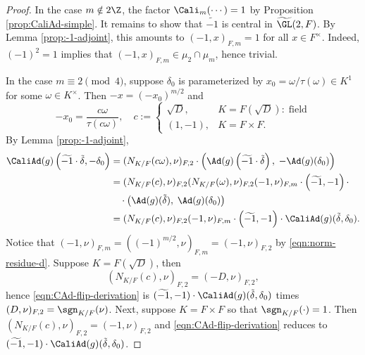 \documentclass[a4paper,10pt]{article}
\begin{document}
\begin{proof}	
	In the case $m \notin 2\Z$, the factor $\Cali_m(\cdots) = 1$ by Proposition \ref{prop:CaliAd-simple}. It remains to show that $\widetilde{-1}$ is central in $\widetilde{\GL}(2,F)$. By Lemma \ref{prop:-1-adjoint}, this amounts to $(-1, x)_{F,m} = 1$ for all $x \in F^\times$. Indeed, $(-1)^2 = 1$ implies that $(-1, x)_{F,m} \in \mu_2 \cap \mu_m$, hence trivial.
	
	In the case $m \equiv 2 \pmod 4$, suppose $\delta_0$ is parameterized by $x_0 = \omega/\tau(\omega) \in K^1$ for some $\omega \in K^\times$. Then $-x = (-x_0)^{m/2}$ and
	\[ -x_0 = \dfrac{c\omega}{\tau(c\omega)}, \quad c :=
	\begin{cases}
		\sqrt{D}, & K = F(\sqrt{D}): \;\text{field} \\
		(1,-1), & K = F \times F.
	\end{cases}\]
	By Lemma \ref{prop:-1-adjoint},
	\begin{equation}\label{eqn:CAd-flip-derivation} \begin{aligned}
		\CaliAd(g)\left( \widetilde{-1} \cdot \tilde{\delta}, -\delta_0 \right) & = (N_{K/F}(c\omega), \nu)_{F,2} \cdot \left( \Ad(g)\left( \widetilde{-1} \cdot \tilde{\delta} \right), \; -\Ad(g)(\delta_0) \right) \\
		& = (N_{K/F}(c), \nu)_{F,2} (N_{K/F}(\omega), \nu)_{F,2} (-1, \nu)_{F,m} \cdot \left( \widetilde{-1}, -1\right) \cdot \\
		& \quad \cdot \left( \Ad(g)(\tilde{\delta}),\; \Ad(g)(\delta_0) \right) \\
		& = (N_{K/F}(c), \nu)_{F,2} (-1, \nu)_{F,m} \cdot \left( \widetilde{-1}, -1 \right) \cdot \CaliAd(g)(\tilde{\delta}, \delta_0).
	\end{aligned}\end{equation}
	Notice that $(-1, \nu)_{F,m} = ((-1)^{m/2}, \nu)_{F,m} = (-1, \nu)_{F,2}$ by \eqref{eqn:norm-residue-d}. Suppose $K = F(\sqrt{D})$, then
	\[ (N_{K/F}(c), \nu)_{F,2} = (-D, \nu)_{F,2}, \]
	hence \eqref{eqn:CAd-flip-derivation} is $(\widetilde{-1}, -1) \cdot \CaliAd(g)(\tilde{\delta}, \delta_0)$ times $(D, \nu)_{F,2} = \sgn_{K/F}(\nu)$. Next, suppose $K = F \times F$ so that $\sgn_{K/F}(\cdot)=1$. Then $(N_{K/F}(c), \nu)_{F,2} = (-1, \nu)_{F,2}$ and \eqref{eqn:CAd-flip-derivation} reduces to $(\widetilde{-1}, -1) \cdot \CaliAd(g)(\tilde{\delta}, \delta_0)$.
\end{proof}
\end{document}
